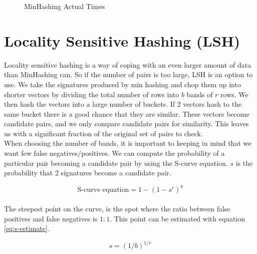 \documentclass[a4paper,11pt]{article}
\begin{document}
\begin{figure}[!htpb]
    \begin{center}
        
        \caption{MinHashing Actual Times}
        \label{fig:minhashing_at}
    \end{center}
\end{figure}


\section{Locality Sensitive Hashing (LSH)}
Locality sensitive hashing is a way of coping with an even larger amount of data than MinHashing can. So if the number of pairs is too large, LSH is an option to use. We take the signatures produced by min hashing and chop them up into shorter vectors by dividing the total number of rows into $b$ bands of $r$ rows. We then hash the vectors into a large number of buckets. If 2 vectors hash to the same bucket there is a good chance that they are similar. These vectors become candidate pairs, and we only compare candidate pairs for similarity. This leaves us with a significant fraction of the original set of pairs to check. \\

When choosing the number of bands, it is important to keeping in mind that we want few false negatives/positives. We can compute the probability of a particular pair becoming a candidate pair by using the S-curve equation. $s$ is the probability that 2 signatures become a candidate pair.

\begin{equation}
    \text {S-curve equation} = 1 - (1 - s^r)^b 
\end{equation}\\

The steepest point on the curve, is the spot where the ratio between false positives and false negatives is $1:1$. This point can be estimated with equation \ref{eq:s-estimate}.

\begin{equation}
    s = (1/b)^{1/r}
    \label{eq:s-estimate}
\end{equation}
\end{document}
